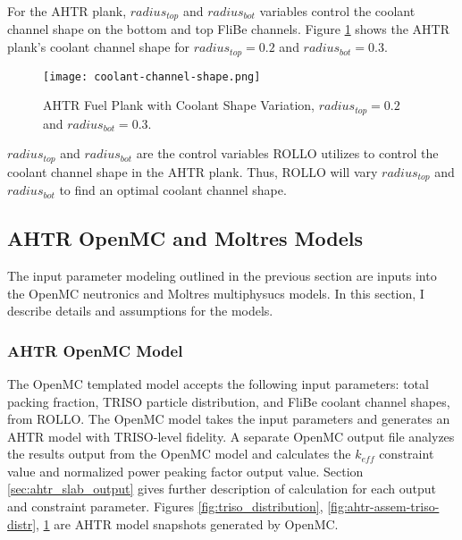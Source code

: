 For the \gls{AHTR} plank, $radius_{top}$ and $radius_{bot}$ variables control the coolant channel 
shape on the bottom and top FliBe channels. 
Figure \ref{fig:coolant-channel-shape} shows the \gls{AHTR} plank's coolant channel shape 
for $radius_{top} = 0.2$ and $radius_{bot} = 0.3$.
\begin{figure}[]
    \centering
        \texttt{[image: coolant-channel-shape.png]}
    \raggedright
    \caption{AHTR Fuel Plank with Coolant Shape Variation, $radius_{top} 
    = 0.2$ and $radius_{bot} = 0.3$.}  
    \label{fig:coolant-channel-shape}
\end{figure}
$radius_{top}$ and $radius_{bot}$ are the control variables \gls{ROLLO} 
utilizes to control the coolant channel shape in the \gls{AHTR} plank.
Thus, \gls{ROLLO} will vary $radius_{top}$ and $radius_{bot}$ to find an optimal coolant 
channel shape.


\subsection{AHTR OpenMC and Moltres Models}
\label{sec:ahtr-moltres-hom}
The input parameter modeling outlined in the previous section are inputs into 
the OpenMC neutronics and Moltres multiphysucs models. 
In this section, I describe details and assumptions for the models. 

\subsubsection{AHTR OpenMC Model}
The OpenMC templated model accepts the following input parameters: total packing fraction, 
TRISO particle distribution, and FliBe coolant channel shapes, from \gls{ROLLO}.
The OpenMC model takes the input parameters and generates an \gls{AHTR} model with 
\gls{TRISO}-level fidelity. 
A separate OpenMC output file analyzes the results output from the OpenMC model and 
calculates the $k_{eff}$ constraint value and normalized power peaking factor output value.
Section \ref{sec:ahtr_slab_output} gives further description of calculation for 
each output and constraint parameter.
Figures \ref{fig:triso_distribution}, \ref{fig:ahtr-assem-triso-distr},
\ref{fig:coolant-channel-shape} are \gls{AHTR} model snapshots generated by OpenMC. 

